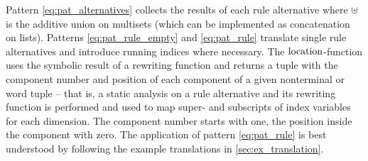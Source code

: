 \documentclass[
    a4paper,
    12pt,
    twoside,
    BCOR=12mm,
    parskip=half,
    chapterprefix,
    numbers=noenddot,
    bibliography=totoc
]{scrbook}
\begin{document}
Pattern \ref{eq:pat_alternatives} collects the results of each rule alternative where $\uplus$ is the additive union on multisets (which can be implemented as concatenation on lists). Patterns \ref{eq:pat_rule_empty} and \ref{eq:pat_rule} translate single rule alternatives and introduce running indices where necessary. The $\mathrm{location}$-function uses the symbolic result of a rewriting function and returns a tuple with the component number and position of each component of a given nonterminal or word tuple -- that is, a static analysis on a rule alternative and its rewriting function is performed and used to map super- and subscripts of index variables for each dimension. The component number starts with one, the position inside the component with zero. The application of pattern \ref{eq:pat_rule} is best understood by following the example translations in \cref{sec:ex_translation}.
\end{document}
